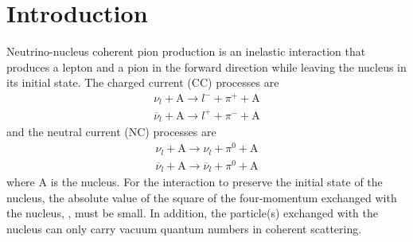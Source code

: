 \section{Introduction}
\label{ch:introduce}

Neutrino-nucleus coherent pion production is an inelastic interaction that produces a lepton and a pion in the forward
direction while leaving the nucleus in its initial state.  The charged current (CC) processes are
\begin{eqnarray}
\nu_{l} + \text{A} \to l^{-} + \pi^{+} + \text{A} \nonumber \\
\overline{\nu}_{l} + \text{A} \to l^{+} + \pi^{-} + \text{A}
\end{eqnarray}
and the neutral current (NC) processes are
\begin{eqnarray}
\nu_{l} + \text{A} \to \nu_{l} + \pi^{0} + \text{A} \nonumber \\
\overline{\nu}_{l} + \text{A} \to \overline{\nu}_{l} + \pi^{0} + \text{A}
\end{eqnarray}
where A is the nucleus.  For the interaction to preserve the initial state of the nucleus, the absolute value of the square of the four-momentum
exchanged with the nucleus, \tabs, must be small.
In addition, the particle(s) exchanged with the nucleus can only carry vacuum quantum numbers in coherent scattering.  



